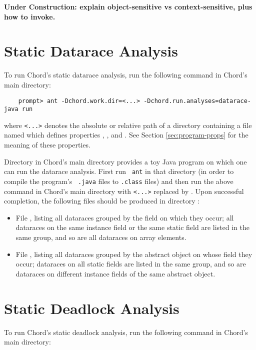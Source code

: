 {\bf Under Construction: explain object-sensitive vs context-sensitive, plus how to invoke.}

\section{Static Datarace Analysis}

To run Chord's static datarace analysis, run the following
command in Chord's main directory:

\begin{verbatim}
    prompt> ant -Dchord.work.dir=<...> -Dchord.run.analyses=datarace-java run
\end{verbatim}

where {\tt <...>} denotes the absolute or relative path of a directory
containing a file named  which defines
properties , , and
.  See Section \ref{sec:program-props} for the
meaning of these properties.

Directory  in Chord's main directory provides a toy Java
program on which one can run the datarace analysis.  First run {\tt
  ant} in that directory (in order to compile the program's {\tt
  .java} files to {\tt .class} files) and then run the above command
in Chord's main directory with {\tt <...>} replaced by
.  Upon successful completion, the
following files should be produced in directory
:

\begin{itemize}
\item
File , listing all dataraces grouped by
the field on which they occur; all dataraces on the same instance
field or the same static field are listed in the same group, and so
are all dataraces on array elements.
\item
File , listing all dataraces grouped by
the abstract object on whose field they occur; dataraces on all static
fields are listed in the same group, and so are dataraces on different
instance fields of the same abstract object.
\end{itemize}

\section{Static Deadlock Analysis}

To run Chord's static deadlock analysis,  run the following
command in Chord's main directory:

